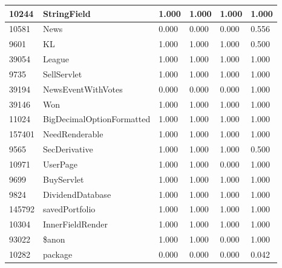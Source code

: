 \documentclass[a4paper]{article}
\newlength{\DUtablewidth} %
\begin{document}
\begin{longtable*}[c]{|p{0.160\DUtablewidth}|p{0.160\DUtablewidth}|p{0.160\DUtablewidth}|p{0.160\DUtablewidth}|p{0.160\DUtablewidth}|p{0.160\DUtablewidth}|}
10244
 & 
StringField
 & 
1.000
 & 
1.000
 & 
1.000
 & 
1.000
 \\
\hline

10581
 & 
News
 & 
0.000
 & 
0.000
 & 
0.000
 & 
0.556
 \\
\hline

9601
 & 
KL
 & 
1.000
 & 
1.000
 & 
1.000
 & 
0.500
 \\
\hline

39054
 & 
League
 & 
1.000
 & 
1.000
 & 
1.000
 & 
1.000
 \\
\hline

9735
 & 
SellServlet
 & 
1.000
 & 
1.000
 & 
1.000
 & 
1.000
 \\
\hline

39194
 & 
NewsEventWithVotes
 & 
0.000
 & 
0.000
 & 
0.000
 & 
1.000
 \\
\hline

39146
 & 
Won
 & 
1.000
 & 
1.000
 & 
1.000
 & 
1.000
 \\
\hline

11024
 & 
BigDecimalOptionFormatted
 & 
1.000
 & 
1.000
 & 
1.000
 & 
1.000
 \\
\hline

157401
 & 
NeedRenderable
 & 
1.000
 & 
1.000
 & 
1.000
 & 
1.000
 \\
\hline

9565
 & 
SecDerivative
 & 
1.000
 & 
1.000
 & 
1.000
 & 
0.500
 \\
\hline

10971
 & 
UserPage
 & 
1.000
 & 
1.000
 & 
0.000
 & 
1.000
 \\
\hline

9699
 & 
BuyServlet
 & 
1.000
 & 
1.000
 & 
1.000
 & 
1.000
 \\
\hline

9824
 & 
DividendDatabase
 & 
1.000
 & 
1.000
 & 
1.000
 & 
1.000
 \\
\hline

145792
 & 
savedPortfolio
 & 
1.000
 & 
1.000
 & 
1.000
 & 
1.000
 \\
\hline

10304
 & 
InnerFieldRender
 & 
1.000
 & 
1.000
 & 
1.000
 & 
1.000
 \\
\hline

93022
 & 
\$anon
 & 
1.000
 & 
1.000
 & 
0.000
 & 
1.000
 \\
\hline

10282
 & 
package
 & 
0.000
 & 
0.000
 & 
0.000
 & 
0.042
 \\
\hline


\end{longtable*}
\end{document}
